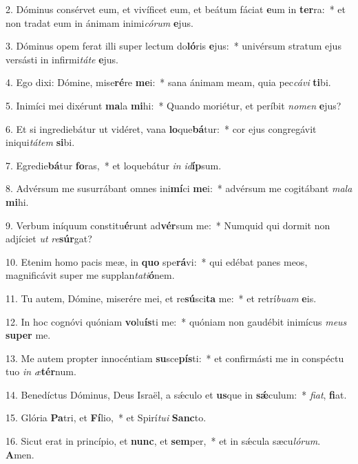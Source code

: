 2. Dóminus consérvet eum, et vivíficet eum, et beátum fáciat \textbf{e}um in \textbf{ter}ra:~*  et non tradat eum in ánimam inimi\textit{có}\textit{rum} \textbf{e}jus.\

3. Dóminus opem ferat illi super lectum do\textbf{ló}ris \textbf{e}jus:~*  univérsum stratum ejus versásti in infirmi\textit{tá}\textit{te} \textbf{e}jus.\

4. Ego dixi: Dómine, mise\textbf{ré}re \textbf{me}i:~*  sana ánimam meam, quia pec\textit{cá}\textit{vi} \textbf{ti}bi.\

5. Inimíci mei dixérunt \textbf{ma}la \textbf{mi}hi:~*  Quando moriétur, et períbit \textit{no}\textit{men} \textbf{e}jus?\

6. Et si ingrediebátur ut vidéret, vana \textbf{lo}que\textbf{bá}tur:~*  cor ejus congregávit iniqui\textit{tá}\textit{tem} \textbf{si}bi.\

7. Egredie\textbf{bá}tur \textbf{fo}ras,~*  et loquebátur \textit{in} \textit{id}\textbf{íp}sum.\

8. Advérsum me susurrábant omnes ini\textbf{mí}ci \textbf{me}i:~*  advérsum me cogitábant \textit{ma}\textit{la} \textbf{mi}hi.\

9. Verbum iníquum constitu\textbf{é}runt ad\textbf{vér}sum me:~*  Numquid qui dormit non adjíciet \textit{ut} \textit{re}\textbf{súr}gat?\

10. Etenim homo pacis meæ, in \textbf{quo} spe\textbf{rá}vi:~*  qui edébat panes meos, magnificávit super me supplan\textit{ta}\textit{ti}\textbf{ó}nem.\

11. Tu autem, Dómine, miserére mei, et re\textbf{sú}sci\textbf{ta} me:~*  et retrí\textit{bu}\textit{am} \textbf{e}is.\

12. In hoc cognóvi quóniam \textbf{vo}lu\textbf{ís}ti me:~*  quóniam non gaudébit inimícus \textit{me}\textit{us} \textbf{su}\textbf{per} me.\

13. Me autem propter innocéntiam \textbf{su}sce\textbf{pís}ti:~*  et confirmásti me in conspéctu tuo \textit{in} \textit{æ}\textbf{tér}num.\

14. Benedíctus Dóminus, Deus Israël, a sǽculo et \textbf{us}que in \textbf{sǽ}culum:~*  \textit{fi}\textit{at}, \textbf{fi}at.\

15. Glória \textbf{Pa}tri, et \textbf{Fí}lio,~*  et Spirí\textit{tu}\textit{i} \textbf{Sanc}to.\

16. Sicut erat in princípio, et \textbf{nunc}, et \textbf{sem}per,~*  et in sǽcula sæcu\textit{ló}\textit{rum}. \textbf{A}men.\

